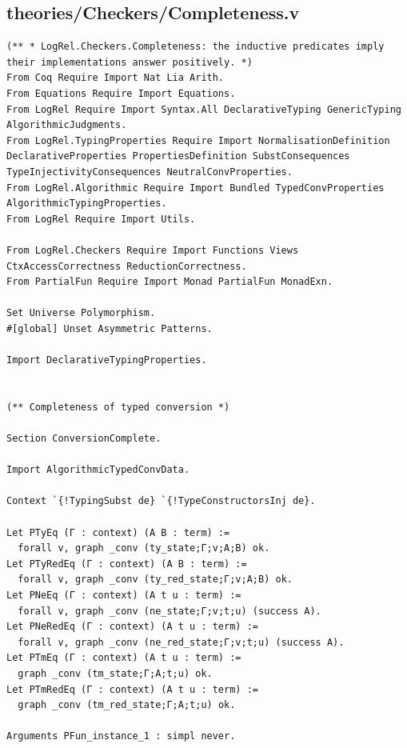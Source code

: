\documentclass[10pt,a4paper]{amsart}
\begin{document}
\subsection*{theories/Checkers/Completeness.v}
\begin{lstlisting}
(** * LogRel.Checkers.Completeness: the inductive predicates imply their implementations answer positively. *)
From Coq Require Import Nat Lia Arith.
From Equations Require Import Equations.
From LogRel Require Import Syntax.All DeclarativeTyping GenericTyping AlgorithmicJudgments.
From LogRel.TypingProperties Require Import NormalisationDefinition DeclarativeProperties PropertiesDefinition SubstConsequences TypeInjectivityConsequences NeutralConvProperties.
From LogRel.Algorithmic Require Import Bundled TypedConvProperties AlgorithmicTypingProperties.
From LogRel Require Import Utils.

From LogRel.Checkers Require Import Functions Views CtxAccessCorrectness ReductionCorrectness.
From PartialFun Require Import Monad PartialFun MonadExn.

Set Universe Polymorphism.
#[global] Unset Asymmetric Patterns.

Import DeclarativeTypingProperties.


(** Completeness of typed conversion *)

Section ConversionComplete.

Import AlgorithmicTypedConvData.

Context `{!TypingSubst de} `{!TypeConstructorsInj de}.

Let PTyEq (Γ : context) (A B : term) :=
  forall v, graph _conv (ty_state;Γ;v;A;B) ok.
Let PTyRedEq (Γ : context) (A B : term) :=
  forall v, graph _conv (ty_red_state;Γ;v;A;B) ok. 
Let PNeEq (Γ : context) (A t u : term) :=
  forall v, graph _conv (ne_state;Γ;v;t;u) (success A).
Let PNeRedEq (Γ : context) (A t u : term) :=
  forall v, graph _conv (ne_red_state;Γ;v;t;u) (success A).
Let PTmEq (Γ : context) (A t u : term) := 
  graph _conv (tm_state;Γ;A;t;u) ok.
Let PTmRedEq (Γ : context) (A t u : term) :=
  graph _conv (tm_red_state;Γ;A;t;u) ok.

Arguments PFun_instance_1 : simpl never.


\end{lstlisting}
\end{document}
